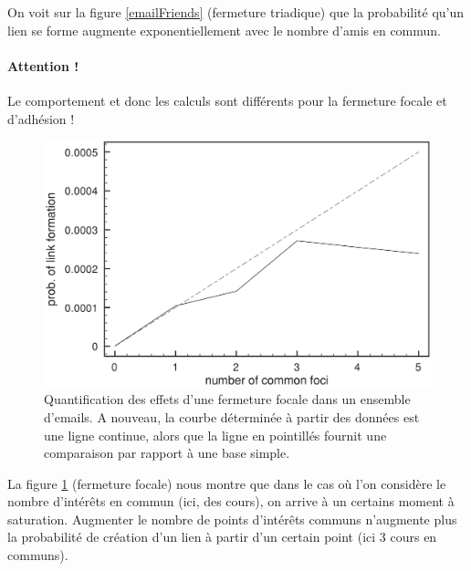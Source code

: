 On voit sur la figure \ref{emailFriends} (fermeture triadique) que la probabilité qu'un lien se forme augmente exponentiellement avec le nombre d'amis en commun.

\paragraph{Attention !}
Le comportement et donc les calculs sont différents pour la fermeture focale et d'adhésion !

\begin{figure}[!ht]
    \centering
    \includegraphics[width=\textwidth]{images/21_pointsCommuns.png}
    \caption{Quantification des effets d'une fermeture focale dans un
        ensemble d'emails. A nouveau, la courbe déterminée à partir des
        données est une ligne continue, alors que la ligne en pointillés
    fournit une comparaison par rapport à une base simple.}
    \label{pointsCommuns}
\end{figure}

La figure \ref{pointsCommuns} (fermeture focale) nous montre que dans le cas où l'on considère le nombre d'intérêts en commun (ici, des cours), on arrive à un certains moment à saturation. Augmenter le nombre de points d'intérêts communs n'augmente plus la probabilité de création d'un lien à partir d'un certain point (ici 3 cours en communs).

